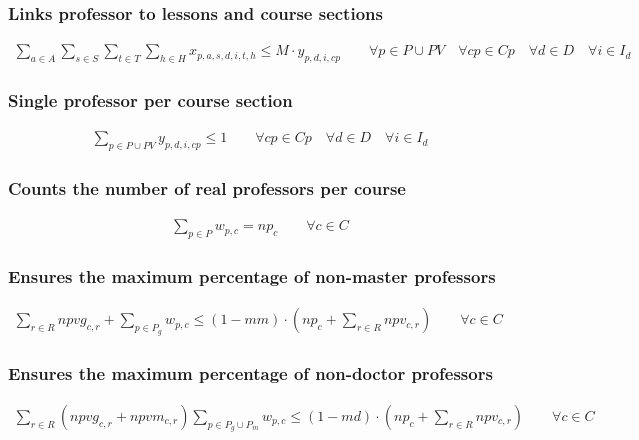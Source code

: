 \subsubsection{Links professor to lessons and course sections}
\begin{eqnarray}
\sum\limits_{a \in A} \sum\limits_{s \in S} \sum\limits_{t \in T} \sum\limits_{h \in H} x_{p,a,s,d,i,t,h} \leq  M \cdot y_{p,d,i,cp} \nonumber \qquad 
\forall p \in P \cup PV \quad
\forall cp \in Cp \quad
\forall d \in D \quad
\forall i \in I_{d}
\end{eqnarray}

\subsubsection{Single professor per course section}
\begin{eqnarray}
\sum\limits_{p \in P \cup PV} y_{p,d,i,cp} \leq 1 \nonumber \qquad
\forall cp \in Cp \quad
\forall d \in D \quad
\forall i \in I_{d}
\end{eqnarray}

\subsubsection{Counts the number of real professors per course}
\begin{eqnarray}
\sum\limits_{p \in P} w_{p,c} = np_{c} \nonumber \qquad 
\forall c \in C
\end{eqnarray}

\subsubsection{Ensures the maximum percentage of non-master professors}
\begin{eqnarray}
\sum\limits_{r \in R} npvg_{c,r} + \sum\limits_{p \in P_{g}} w_{p,c} \le (1-mm) \cdot (np_{c} + \sum\limits_{r \in R} npv_{c,r}) \nonumber \qquad 
\forall c \in C \quad
\end{eqnarray}

\subsubsection{Ensures the maximum percentage of non-doctor professors}
\begin{eqnarray}
\sum\limits_{r \in R}( npvg_{c,r} + npvm_{c,r} ) \sum\limits_{p \in P_{g} \cup P_{m} } w_{p,c} \le (1-md) \cdot (np_{c} + \sum\limits_{r \in R} npv_{c,r}) \nonumber \qquad 
\forall c \in C \quad
\end{eqnarray}


